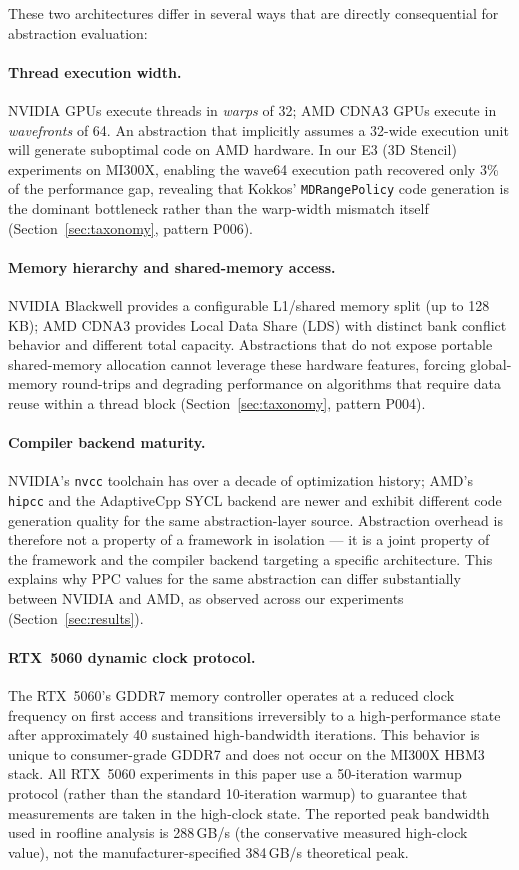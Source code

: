 These two architectures differ in several ways that are directly consequential
for abstraction evaluation:

\paragraph{Thread execution width.}
NVIDIA GPUs execute threads in \emph{warps} of 32; AMD CDNA3 GPUs execute in
\emph{wavefronts} of 64. An abstraction that implicitly assumes a 32-wide
execution unit will generate suboptimal code on AMD hardware. In our E3
(3D Stencil) experiments on MI300X, enabling the wave64 execution path
recovered only 3\% of the performance gap, revealing that Kokkos'
\texttt{MDRangePolicy} code generation is the dominant bottleneck rather
than the warp-width mismatch itself (Section~\ref{sec:taxonomy}, pattern P006).

\paragraph{Memory hierarchy and shared-memory access.}
NVIDIA Blackwell provides a configurable L1/shared memory split (up to
128\,KB); AMD CDNA3 provides Local Data Share (LDS) with distinct bank
conflict behavior and different total capacity. Abstractions that do not
expose portable shared-memory allocation cannot leverage these hardware
features, forcing global-memory round-trips and degrading performance on
algorithms that require data reuse within a thread block
(Section~\ref{sec:taxonomy}, pattern P004).

\paragraph{Compiler backend maturity.}
NVIDIA's \texttt{nvcc} toolchain has over a decade of optimization history;
AMD's \texttt{hipcc} and the AdaptiveCpp SYCL backend are newer and exhibit
different code generation quality for the same abstraction-layer source.
Abstraction overhead is therefore not a property of a framework in isolation
--- it is a joint property of the framework and the compiler backend targeting
a specific architecture. This explains why PPC values for the same abstraction
can differ substantially between NVIDIA and AMD, as observed across our
experiments (Section~\ref{sec:results}).

\paragraph{RTX~5060 dynamic clock protocol.}
The RTX~5060's GDDR7 memory controller operates at a reduced clock frequency
on first access and transitions irreversibly to a high-performance state
after approximately 40 sustained high-bandwidth iterations. This behavior
is unique to consumer-grade GDDR7 and does not occur on the MI300X HBM3
stack. All RTX~5060 experiments in this paper use a 50-iteration warmup
protocol (rather than the standard 10-iteration warmup) to guarantee
that measurements are taken in the high-clock state. The reported peak
bandwidth used in roofline analysis is 288\,GB/s (the conservative
measured high-clock value), not the manufacturer-specified 384\,GB/s
theoretical peak.

